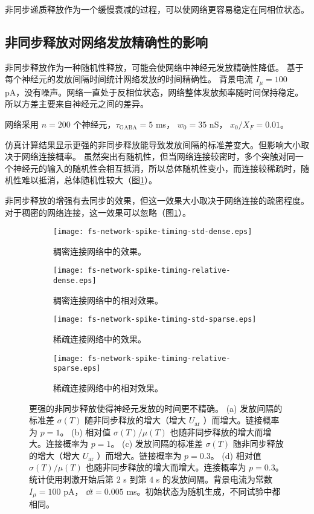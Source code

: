 非同步递质释放作为一个缓慢衰减的过程，可以使网络更容易稳定在同相位状态。

\subsection{非同步释放对网络发放精确性的影响}
\label{section:result:network-spike-timing}
非同步释放作为一种随机性释放，可能会使网络中神经元发放精确性降低。
基于每个神经元的发放间隔时间统计网络发放的时间精确性。
背景电流 $I_{\mu} = 100$ pA，没有噪声。网络一直处于反相位状态，网络整体发放频率随时间保持稳定。所以方差主要来自神经元之间的差异。

网络采用 $n = 200$ 个神经元，$\tau_\text{GABA} = 5$ ms， $w_0 = 35$ nS， $x_0 / X_F = 0.01$。

仿真计算结果显示更强的非同步释放能导致发放间隔的标准差变大。但影响大小取决于网络连接概率。
虽然突出有随机性，但当网络连接较密时，多个突触对同一个神经元的输入的随机性会相互抵消，所以总体随机性变小，而连接较稀疏时，随机性难以抵消，总体随机性较大（图\ref{figure:spike-timing-precision}）。

非同步释放的增强有去同步的效果，但这一效果大小取决于网络连接的疏密程度。对于稠密的网络连接，这一效果可以忽略（图\ref{figure:spike-timing-precision}）。

\begin{figure}[H]
    \begin{subfigure}{0.5\textwidth}
        \texttt{[image: fs-network-spike-timing-std-dense.eps]}
        \caption{稠密连接网络中的效果。}
    \end{subfigure}
    \begin{subfigure}{0.5\textwidth}
        \texttt{[image: fs-network-spike-timing-relative-dense.eps]}
        \caption{稠密连接网络中的相对效果。}
    \end{subfigure}
    \begin{subfigure}{0.5\textwidth}
        \texttt{[image: fs-network-spike-timing-std-sparse.eps]}
        \caption{稀疏连接网络中的效果。}
    \end{subfigure}
    \begin{subfigure}{0.5\textwidth}
        \texttt{[image: fs-network-spike-timing-relative-sparse.eps]}
        \caption{稀疏连接网络中的相对效果。}
    \end{subfigure}
\caption{更强的非同步释放使得神经元发放的时间更不精确。
(a) 发放间隔的标准差 $\sigma(T)$ 随非同步释放的增大（增大 $U_\text{ar}$ ）而增大。链接概率为 $p = 1$。
(b) 相对值 $\sigma(T)/\mu(T)$ 也随非同步释放的增大而增大。连接概率为 $p = 1$。
(c) 发放间隔的标准差 $\sigma(T)$ 随非同步释放的增大（增大 $U_\text{ar}$ ）而增大。链接概率为 $p = 0.3$。
(d) 相对值 $\sigma(T)/\mu(T)$ 也随非同步释放的增大而增大。连接概率为 $p = 0.3$。
统计使用刺激开始后第 $2$ s 到第 $4$ s 的发放间隔。背景电流为常数 $I_{\mu} = 100$ pA， $\dd{t} = 0.005$ ms。初始状态为随机生成，不同试验中都相同。}
\label{figure:spike-timing-precision}
\end{figure}

